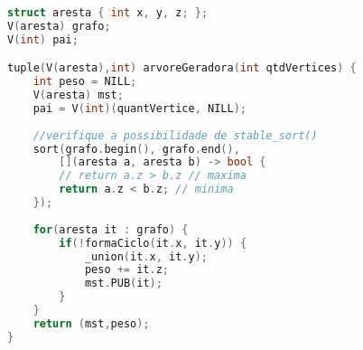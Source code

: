 \begin{lstlisting}[language=C++, title={Algoritmo de Kruskal}]
struct aresta { int x, y, z; };
V(aresta) grafo;
V(int) pai;

tuple(V(aresta),int) arvoreGeradora(int qtdVertices) {
	int peso = NILL;
    V(aresta) mst;
	pai = V(int)(quantVertice, NILL);
    
    //verifique a possibilidade de stable_sort()
    sort(grafo.begin(), grafo.end(), 
    	[](aresta a, aresta b) -> bool {
    	// return a.z > b.z // maxima
        return a.z < b.z; // minima
    });
    
	for(aresta it : grafo) {
		if(!formaCiclo(it.x, it.y)) {
			_union(it.x, it.y);
			peso += it.z;
            mst.PUB(it);
		}
	}
	return (mst,peso);
}
\end{lstlisting}
